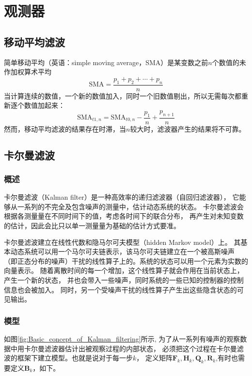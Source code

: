 \chapter{观测器}
\label{chap:chapter03}
\section{移动平均滤波}
简单移动平均（英语：simple moving average，SMA）是某变数之前$n$个数值的未作加权算术平均
\begin{equation}
  \text{SMA}=\frac{p_1+p_2+\cdots + p_n}{n}
\end{equation}
当计算连续的数值，一个新的数值加入，同时一个旧数值剔出，所以无需每次都重新逐个数值加起来：
\begin{equation}
  \text{SMA}_{t1,n}=  \text{SMA}_{t0,n}-\frac{p_1}{n} +\frac{p_{n+1}}{n}
\end{equation}
然而，移动平均滤波的结果存在时滞，当$n$较大时，滤波器产生的结果将不可靠。

\section{卡尔曼滤波}
\subsection{概述}

卡尔曼滤波（Kalman filter）是一种高效率的递归滤波器（自回归滤波器），
它能够从一系列的不完全及包含噪声的测量中，估计动态系统的状态。
卡尔曼滤波会根据各测量量在不同时间下的值，考虑各时间下的联合分布，
再产生对未知变数的估计，因此会比只以单一测量量为基础的估计方式要准。

卡尔曼滤波建立在线性代数和隐马尔可夫模型（hidden Markov model）上。
其基本动态系统可以用一个马尔可夫链表示，该马尔可夫链建立在一个被高斯噪声
（即正态分布的噪声）干扰的线性算子上的。系统的状态可以用一个元素为实数的向量表示。
随着离散时间的每一个增加，这个线性算子就会作用在当前状态上，产生一个新的状态，
并也会带入一些噪声，同时系统的一些已知的控制器的控制信息也会被加入。
同时，另一个受噪声干扰的线性算子产生出这些隐含状态的可见输出。

\subsection{模型}
如图\ref{fig:Basic_concept_of_Kalman_filtering}所示,
为了从一系列有噪声的观察数据中用卡尔曼滤波器估计出被观察过程的内部状态，
必须把这个过程在卡尔曼滤波的框架下建立模型。也就是说对于每一步$k$，
定义矩阵$\bm{F}_k, \bm{H}_k, \bm{Q}_k, \bm{R}_k$,有时也需要定义$\bm{B}_k$，如下。


